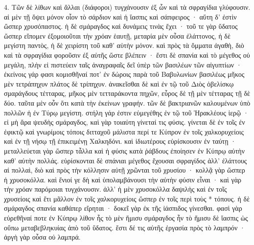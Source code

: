\documentclass[a4paper, 11pt, oneside, polutonikogreek, german]{article}
\begin{document}
4. Τῶν δὲ λίθων καὶ ἄλλαι (διάφοροι) τυγχάνουσιν ἐξ ὧν καὶ τὰ σφραγίδια γλύφουσιν. αἱ μὲν τῇ ὄψει μόνον οἷον τὸ σάρδιον καὶ ἡ ἴασπις καὶ σάπφειρος · αὕτη δ' ἐστὶν ὥσπερ χρυσόπαστος. ἡ δὲ σμάραγδος καὶ δυνάμεις τινὰς ἔχει · τοῦ τε γὰρ ὕδατος ὥσπερ εἴπομεν ἐξομοιοῦται τὴν χρόαν ἑαυτῇ, μεταρία μὲν οὖσα ἐλάττονος, ἡ δὲ μεγίστη παντὸς, ἡ δὲ χειρίστη τοῦ καθ' αὑτὴν μόνον. καὶ πρὸς τὰ ὄμματα ἀγαθὴ, διὸ καὶ τὰ σφραγίδια φοροῦσιν ἐξ αὐτῆς ὥστε βλέπειν · ἔστι δὲ σπανία καὶ τὸ μέγεθος οὐ μεγάλη, πλὴν εἰ πιστεύειν ταῖς ἀναγραφαῖς δεῖ ὑπὲρ τῶν βασιλέων τῶν αἰγυπτίων · ἐκείνοις γάρ φασι κομισθῆναί ποτ' ἐν δώροις παρὰ τοῦ Βαβυλωνίων βασιλέως μῆκος μὲν τετράπηχυν πλάτος δὲ τρίπηχυν. ἀνακεῖσθαι δὲ καὶ ἐν τῷ τοῦ Διὸς ὀβελίσκῳ σμαράγδους τέτταρας, μῆκος μὲν τετταράκοντα πηχῶν, εὖρος δὲ τῇ μὲν τέτταρας τῇ δὲ δύο. ταῦτα μὲν οὖν ὅτι κατὰ τὴν ἐκείνων γραφήν. τῶν δὲ βακτριανῶν καλουμένων ὑπὸ πολλῶν ἡ ἐν Τύρῳ μεγίστη. στήλη γάρ ἐστιν εὐμεγέθης ἐν τῷ τοῦ Ἡρακλέους ἱερῷ · εἰ μὴ ἄρα ψευδὴς σμάραγδος, καὶ γὰρ τοιαύτη γίνεταί τις φύσις. γίνεται δὲ ἐν τοῖς ἐν ἐφικτῷ καὶ γνωρίμοις τόποις διτταχοῦ μάλιστα περί τε Κύπρον ἐν τοῖς χαλκορυχείοις καὶ ἐν τῇ νήσῳ τῇ ἐπικειμένῃ Χαλκηδόνι. καὶ ἰδιωτέρους εὑρίσκουσιν ἐν ταύτῃ · μεταλλεύεται γὰρ ὥσπερ τἆλλα καὶ ἡ φύσις κατὰ ῥάβδους ἐποίησεν ἐν Κύπρῳ αὐτὴν καθ' αὑτὴν πολλάς. εὑρίσκονται δὲ σπάνιαι μέγεθος ἔχουσαι σφραγίδος ἀλλ' ἐλάττους αἱ πολλαὶ, διὸ καὶ πρὸς τὴν κόλλησιν αὐτῇ χρῶνται τοῦ χρυσίου · κολλᾷ γὰρ ὥσπερ ἡ χρυσοκόλλα. καὶ ἔνιοί γε δὴ καὶ ὑπολαμβάνουσι τὴν αὐτὴν φύσιν εἶναι · καὶ γὰρ τὴν χρόαν παρόμοιαι τυγχάνουσιν. ἀλλ' ἡ μὲν χρυσοκόλλα δαψιλὴς καὶ ἐν τοῖς χρυσείοις καὶ ἔτι μᾶλλον ἐν τοῖς χαλκορυχείοις ὥσπερ ἐν τοῖς περὶ τοὺς * τόπους. ἡ δὲ σμάραγδος σπανία καθάπερ εἴρηται · δοκεῖ γὰρ ἐκ τῆς ἰάσπιδος γίνεσθαι. φασὶ γὰρ εὑρεθῆναί ποτε ἐν Κύπρῳ λίθον ἧς τὸ μὲν ἥμισυ σμάραγδος ἦν τὸ ἥμισυ δὲ ἴασπις ὡς οὔπω μεταβεβληκυίας ἀπὸ τοῦ ὕδατος. ἔστι δέ τις αὐτῆς ἐργασία πρὸς τὸ λαμπρόν · ἀργὴ γὰρ οὖσα οὐ λαμπρά.
\end{document}
